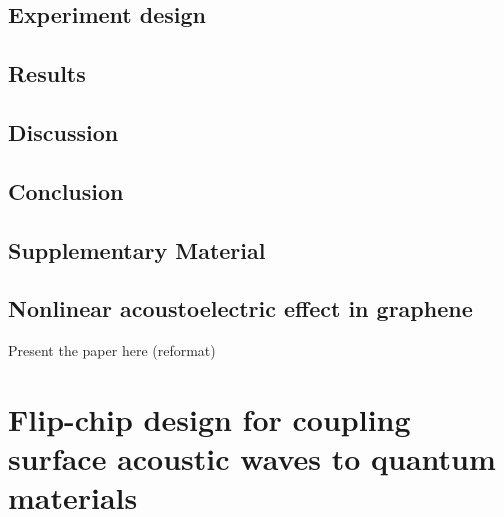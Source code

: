 \documentclass[double,12pt,1in]{beavtex}
\begin{document}
\section{Experiment design}

\section{Results}

\section{Discussion} \label{AE paper discussion}

\section{Conclusion}

\section{Supplementary Material}

\section{Nonlinear acoustoelectric effect in graphene} \label{nonlinear acoustoelectric effect}


Present the paper here (reformat)


\chapter{Flip-chip design for coupling surface acoustic waves to quantum materials} \label{flip-chip chapter}
\end{document}

